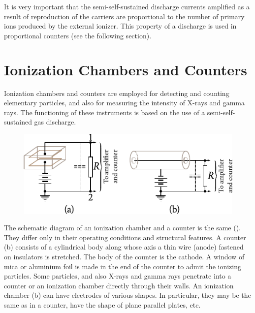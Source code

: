 It is very important that the semi-self-sustained discharge currents amplified as a result of reproduction of the carriers are proportional to the number of primary ions produced by the external ionizer.
This property of a discharge is used in proportional counters (see the following section).

\section{Ionization Chambers and Counters}\label{sec:12_3}

Ionization chambers and counters are employed for detecting and counting elementary particles, and also for measuring the intensity of X-rays and gamma rays.
The functioning of these instruments is based on the use of a semi-self-sustained gas discharge.

\begin{figure}[t]
	\begin{center}
		\includegraphics[scale=1]{figures/ch_12/fig_12_3.pdf}
		\caption[]{}
		\label{fig:12_3}
	\end{center}
	\vspace{-0.8cm}
\end{figure}

The schematic diagram of an ionization chamber and a counter is the same ().
They differ only in their operating conditions and structural features.
A counter (b) consists of a cylindrical body along whose axis a thin wire (anode) fastened on insulators is stretched.
The body of the counter is the cathode.
A window of mica or aluminium foil is made in the end of the counter to admit the ionizing particles.
Some particles, and also X-rays and gamma rays penetrate into a counter or an ionization chamber directly through their walls.
An ionization chamber (b) can have electrodes of various shapes.
In particular, they may be the same as in a counter, have the shape of plane parallel plates, etc.

